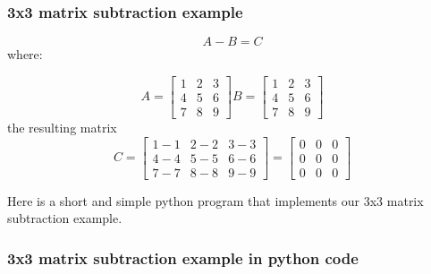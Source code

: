 \documentclass{article}
\begin{document}
\subsubsection{3x3 matrix subtraction example}

\begin{equation*}
  A - B = C 
\end{equation*}
where: 

\[
A = \begin{bmatrix}
    1 & 2 & 3   \\
    4 & 5 & 6   \\
    7 & 8 & 9     
\end{bmatrix}
B = \begin{bmatrix}
    1 & 2 & 3   \\
    4 & 5 & 6   \\
    7 & 8 & 9     
\end{bmatrix} 
\]
the resulting matrix
\[C = 
\begin{bmatrix}
    1-1 & 2-2 & 3-3  \\
    4-4 & 5-5 & 6-6  \\ 
    7-7 & 8-8 & 9-9     
\end{bmatrix}
=
\begin{bmatrix}
    0 & 0 & 0  \\
    0 & 0 & 0  \\
    0 & 0 & 0      
\end{bmatrix}
\]

\vspace{2pc}
\newpage
Here is a short and simple python program that implements our 3x3 matrix subtraction example.
\\
\subsubsection{3x3 matrix subtraction example in python code}



\end{document}

